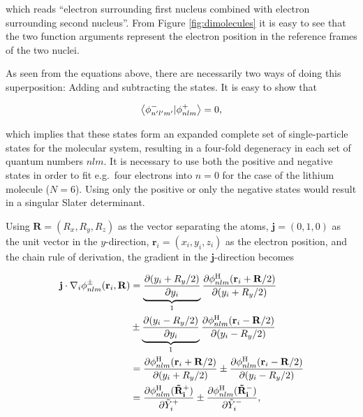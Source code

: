 which reads ``electron surrounding first nucleus combined with electron surrounding second nucleus''. From Figure \ref{fig:dimolecules} it is easy to see that the two function arguments represent the electron position in the reference frames of the two nuclei. 

As seen from the equations above, there are necessarily two ways of doing this superposition: Adding and subtracting the states. It is easy to show that 

\begin{equation}
 \left\langle \phi_{n'l'm'}^- | \phi_{nlm}^+\right\rangle = 0,
\end{equation}

which implies that these states form an expanded complete set of single-particle states for the molecular system, resulting in a four-fold degeneracy in each set of quantum numbers $nlm$. It is necessary to use both the positive and negative states in order to fit e.g.~four electrons into $n=0$ for the case of the lithium molecule ($N=6$). Using only the positive or only the negative states would result in a singular Slater determinant.

Using $\mathbf{R} = \left(R_x, R_y, R_z\right)$ as the vector separating the atoms, $\mathbf{j} = (0, 1, 0)$ as the unit vector in the $y$-direction, $\mathbf{r}_i = \left(x_i, y_i, z_i\right)$ as the electron position, and the chain rule of derivation, the gradient in the $\mathbf{j}$-direction becomes

\begin{align}
 \mathbf{j}\cdot \nabla_i \phi_{nlm}^\pm (\mathbf{r}_i, \mathbf{R}) &= \underbrace{\frac{\partial (y_i + R_y/2)}{\partial y_i}}_{1}\frac{\partial \phi_{nlm}^\mathrm{H}(\mathbf{r}_i + \mathbf{R}/2)}{\partial (y_i + R_y/2)} \notag \\
  &\pm \underbrace{\frac{\partial (y_i - R_y/2)}{\partial y_i}}_{1}\frac{\partial \phi_{nlm}^\mathrm{H}(\mathbf{r}_i - \mathbf{R}/2)}{\partial (y_i - R_y/2)} \notag\\
  &= \frac{\partial \phi_{nlm}^\mathrm{H}(\mathbf{r}_i + \mathbf{R}/2)}{\partial (y_i + R_y/2)} \pm \frac{\partial \phi_{nlm}^\mathrm{H}(\mathbf{r}_i - \mathbf{R}/2)}{\partial (y_i - R_y/2)} \notag\\
  &=  \frac{\partial \phi_{nlm}^\mathrm{H}(\mathbf{\tilde R_i^+})}{\partial \tilde Y_i^+} \pm \frac{\partial \phi_{nlm}^\mathrm{H}(\mathbf{\tilde R_i^-})}{\partial \tilde Y_i^-}, \label{eq:MoleculeWorksWithOldFunctions}
\end{align}

